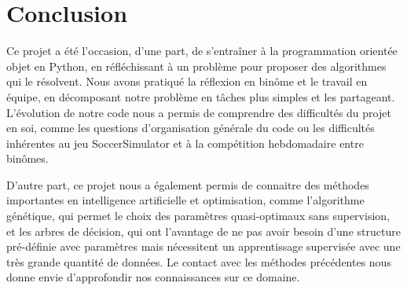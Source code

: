 \documentclass[a4paper,12pt]{article}
\begin{document}
\section{Conclusion}

Ce projet a été l'occasion, d'une part, de s’entraîner à la programmation orientée objet en Python, en réfléchissant à un problème pour proposer des algorithmes qui le résolvent. Nous avons pratiqué la réflexion en binôme et le travail en équipe, en décomposant notre problème en tâches plus simples et les partageant. L'évolution de notre code nous a permis de comprendre des difficultés du projet en soi, comme les questions d'organisation générale du code ou les difficultés inhérentes au jeu SoccerSimulator et à la compétition hebdomadaire entre binômes.

D'autre part, ce projet nous a également permis de connaitre des méthodes importantes en intelligence artificielle et optimisation, comme l'algorithme génétique, qui permet le choix des paramètres quasi-optimaux sans supervision, et les arbres de décision, qui ont l'avantage de ne pas avoir besoin d'une structure pré-définie avec paramètres mais nécessitent un apprentissage supervisée avec une très grande quantité de données. Le contact avec les méthodes précédentes nous donne envie d'approfondir nos connaissances sur ce domaine.
\end{document}
